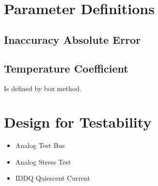 \documentclass{article} %
\begin{document}
\section{Parameter Definitions}

\subsection{Inaccuracy Absolute Error}

\subsection{Temperature Coefficient}

Is defined by box method.


\section{Design for Testability}

\begin{itemize}
	\item Analog Test Bus
	\item Analog Stress Test
	\item IDDQ Quiescent Current
\end{itemize}





\end{document}

